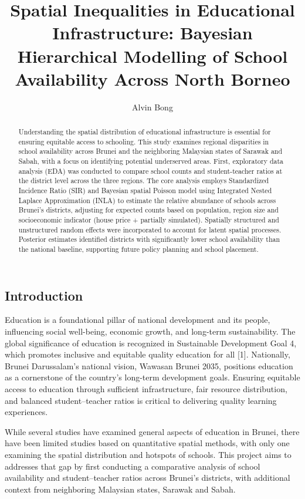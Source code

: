 \documentclass[
  12pt,
]{article}
\title{Spatial Inequalities in Educational Infrastructure: Bayesian
Hierarchical Modelling of School Availability Across North Borneo}
\author{Alvin Bong}
\date{}
\begin{document}
\maketitle
\begin{abstract}
Understanding the spatial distribution of educational infrastructure is
essential for ensuring equitable access to schooling. This study
examines regional disparities in school availability across Brunei and
the neighboring Malaysian states of Sarawak and Sabah, with a focus on
identifying potential underserved areas. First, exploratory data
analysis (EDA) was conducted to compare school counts and
student-teacher ratios at the district level across the three regions.
The core analysis employs Standardized Incidence Ratio (SIR) and
Bayesian spatial Poisson model using Integrated Nested Laplace
Approximation (INLA) to estimate the relative abundance of schools
across Brunei's districts, adjusting for expected counts based on
population, region size and socioeconomic indicator (house price +
partially simulated). Spatially structured and unstructured random
effects were incorporated to account for latent spatial processes.
Posterior estimates identified districts with significantly lower school
availability than the national baseline, supporting future policy
planning and school placement.
\end{abstract}


\subsection{Introduction}\label{introduction}

Education is a foundational pillar of national development and its
people, influencing social well-being, economic growth, and long-term
sustainability. The global significance of education is recognized in
Sustainable Development Goal 4, which promotes inclusive and equitable
quality education for all {[}1{]}. Nationally, Brunei Darussalam's
national vision, Wawasan Brunei 2035, positions education as a
cornerstone of the country's long-term development goals. Ensuring
equitable access to education through sufficient infrastructure, fair
resource distribution, and balanced student--teacher ratios is critical
to delivering quality learning experiences.

While several studies have examined general aspects of education in
Brunei, there have been limited studies based on quantitative spatial
methods, with only one examining the spatial distribution and hotspots
of schools. This project aims to addresses that gap by first conducting
a comparative analysis of school availability and student--teacher
ratios across Brunei's districts, with additional context from
neighboring Malaysian states, Sarawak and Sabah.
\end{document}
